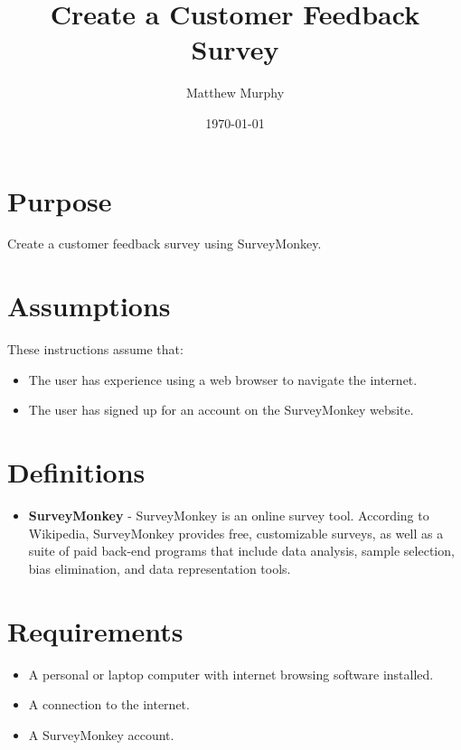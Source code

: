 \documentclass{tufte-handout}
\title{Create a Customer Feedback Survey}
\author{Matthew Murphy}
\date{\today}  %
\begin{document}
\maketitle%

\section{Purpose}
Create a customer feedback survey using SurveyMonkey.

\section{Assumptions}
These instructions assume that:
\begin{itemize}
    \item The user has experience using a web browser to navigate the internet. 
    \item The user has signed up for an account on the SurveyMonkey website. 
\end{itemize}


\section{Definitions}

\begin{itemize}
    \item \textbf{SurveyMonkey} - SurveyMonkey is an online survey tool. According to Wikipedia, SurveyMonkey provides free, customizable surveys, as well as a suite of paid back-end programs that include data analysis, sample selection, bias elimination, and data representation tools. \cite{noauthor_surveymonkey_2018}
\end{itemize}

\section{Requirements}

\begin{itemize}
    \item A personal or laptop computer with internet browsing software installed.
    \item A connection to the internet.
    \item A SurveyMonkey account.
    


\end{itemize}
\end{document}
